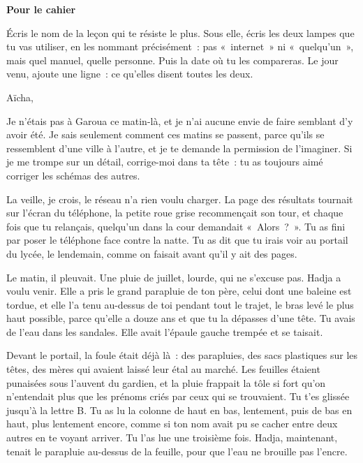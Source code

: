 \documentclass[10.5pt,twoside,openright]{book}
\newenvironment{pourcahier}[1]{\par\vspace{0.9em}\begin{tcolorbox}[colback=black!4,colframe=accent,boxrule=0pt,leftrule=2.2pt,arc=0pt,left=8pt,right=8pt,top=5pt,bottom=5pt]\small\textbf{#1}\par\smallskip}{\end{tcolorbox}\par}
\newcommand{\chapitre}[2]{\cleardoublepage\markright{#2}\thispagestyle{plain}\vspace*{2.2cm}{\noindent\color{accent}\fontsize{54}{54}\selectfont\bfseries #1}\par\vspace{0.5em}{\noindent\LARGE\bfseries #2\par}\vspace{1.6em}\noindent\ignorespaces}
\begin{document}
\begin{pourcahier}{Pour le cahier}
Écris le nom de la leçon qui te résiste le plus. Sous elle, écris les deux lampes que tu vas utiliser, en les nommant précisément : pas « internet » ni « quelqu’un », mais quel manuel, quelle personne. Puis la date où tu les compareras. Le jour venu, ajoute une ligne : ce qu’elles disent toutes les deux.
\end{pourcahier}


\chapitre{14}{Lettre à Aïcha}

Aïcha,

Je n’étais pas à Garoua ce matin-là, et je n’ai aucune envie de faire semblant d’y avoir été. Je sais seulement comment ces matins se passent, parce qu’ils se ressemblent d’une ville à l’autre, et je te demande la permission de l’imaginer. Si je me trompe sur un détail, corrige-moi dans ta tête : tu as toujours aimé corriger les schémas des autres.

La veille, je crois, le réseau n’a rien voulu charger. La page des résultats tournait sur l’écran du téléphone, la petite roue grise recommençait son tour, et chaque fois que tu relançais, quelqu’un dans la cour demandait « Alors ? ». Tu as fini par poser le téléphone face contre la natte. Tu as dit que tu irais voir au portail du lycée, le lendemain, comme on faisait avant qu’il y ait des pages.

Le matin, il pleuvait. Une pluie de juillet, lourde, qui ne s’excuse pas. Hadja a voulu venir. Elle a pris le grand parapluie de ton père, celui dont une baleine est tordue, et elle l’a tenu au-dessus de toi pendant tout le trajet, le bras levé le plus haut possible, parce qu’elle a douze ans et que tu la dépasses d’une tête. Tu avais de l’eau dans les sandales. Elle avait l’épaule gauche trempée et se taisait.

Devant le portail, la foule était déjà là : des parapluies, des sacs plastiques sur les têtes, des mères qui avaient laissé leur étal au marché. Les feuilles étaient punaisées sous l’auvent du gardien, et la pluie frappait la tôle si fort qu’on n’entendait plus que les prénoms criés par ceux qui se trouvaient. Tu t’es glissée jusqu’à la lettre B. Tu as lu la colonne de haut en bas, lentement, puis de bas en haut, plus lentement encore, comme si ton nom avait pu se cacher entre deux autres en te voyant arriver. Tu l’as lue une troisième fois. Hadja, maintenant, tenait le parapluie au-dessus de la feuille, pour que l’eau ne brouille pas l’encre.
\end{document}
